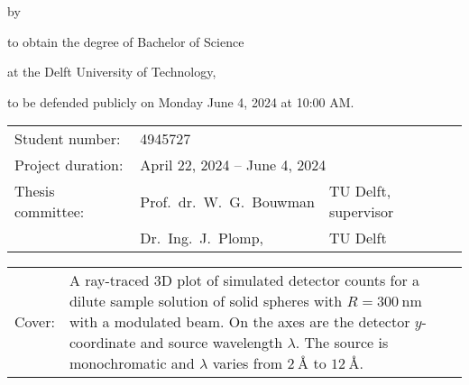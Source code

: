 \begin{titlepage}
	
	\begin{center}
		
		{\makeatletter
			\largetitlestyle\fontsize{45}{45}\selectfont\@title
			\makeatother}
		
		{\makeatletter
			\ifdefvoid{\@subtitle}{}{\bigskip\titlestyle\fontsize{20}{20}\selectfont\@subtitle}
			\makeatother}
		
		\bigskip
		\bigskip
		
		by
		
		\bigskip
		\bigskip
		
		{\makeatletter
			\largetitlestyle\fontsize{25}{25}\selectfont\@author
			\makeatother}
		
		\bigskip
		\bigskip
		
		to obtain the degree of Bachelor of Science
		
		at the Delft University of Technology,
		
		to be defended publicly on Monday June 4, 2024 at 10:00 AM.
		
		\vfill
		
		\begin{tabular}{lll}
			Student number: & 4945727 \\
			Project duration: & \multicolumn{2}{l}{April 22, 2024 -- June 4, 2024} \\
			Thesis committee: & Prof.\ dr.\ W.\ G.\ Bouwman & TU Delft, supervisor \\
			& Dr.\ Ing.\ J.\ Plomp, & TU Delft
		\end{tabular}
		
		\bigskip
		\bigskip
		
		\bigskip
		\bigskip
		\begin{tabular}{p{15mm}p{10cm}}
			Cover: & A ray-traced 3D plot of simulated detector counts for a dilute sample solution of solid spheres with $R = \SI{300}{\nano\meter}$ with a modulated beam. On the axes are the detector $y$-coordinate and source wavelength $\lambda$. The source is monochromatic and $\lambda$ varies from $\SI{2}{\angstrom}$ to $\SI{12}{\angstrom}$.\\
		\end{tabular}
		

\end{center}
\end{titlepage}
